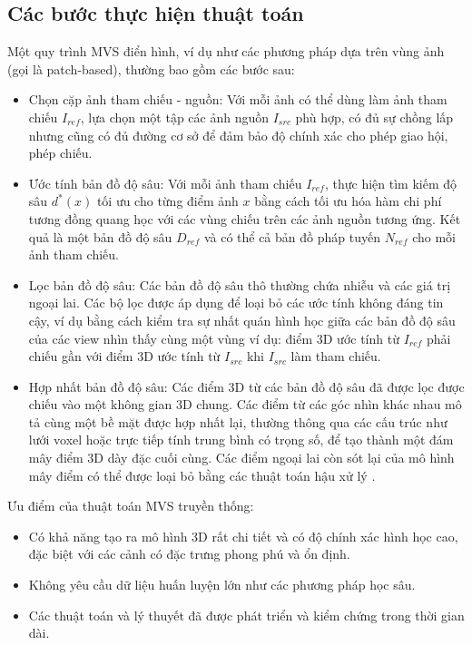 \subsection{Các bước thực hiện thuật toán}
\label{subsec:mvs_steps}

Một quy trình MVS điển hình, ví dụ như các phương pháp dựa trên vùng ảnh (gọi là patch-based), thường bao gồm các bước sau:

\begin{itemize}
    \item Chọn cặp ảnh tham chiếu - nguồn: Với mỗi ảnh có thể dùng làm ảnh tham chiếu $I_{ref}$, lựa chọn một tập các ảnh nguồn $I_{src}$ phù hợp, có đủ sự chồng lấp nhưng cũng có đủ đường cơ sở để đảm bảo độ chính xác cho phép giao hội, phép chiếu.
    \item Ước tính bản đồ độ sâu: Với mỗi ảnh tham chiếu $I_{ref}$, thực hiện tìm kiếm độ sâu $d^*(x)$ tối ưu cho từng điểm ảnh $x$ bằng cách tối ưu hóa hàm chi phí tương đồng quang học với các vùng chiếu trên các ảnh nguồn tương ứng. Kết quả là một bản đồ độ sâu $D_{ref}$ và có thể cả bản đồ pháp tuyến $N_{ref}$ cho mỗi ảnh tham chiếu.

    \item Lọc bản đồ độ sâu: Các bản đồ độ sâu thô thường chứa nhiễu và các giá trị ngoại lai. Các bộ lọc được áp dụng để loại bỏ các ước tính không đáng tin cậy, ví dụ bằng cách kiểm tra sự nhất quán hình học giữa các bản đồ độ sâu của các view nhìn thấy cùng một vùng ví dụ: điểm 3D ước tính từ $I_{ref}$ phải chiếu gần với điểm 3D ước tính từ $I_{src}$ khi $I_{src}$ làm tham chiếu.
    \item Hợp nhất bản đồ độ sâu: Các điểm 3D từ các bản đồ độ sâu đã được lọc được chiếu vào một không gian 3D chung. Các điểm từ các góc nhìn khác nhau mô tả cùng một bề mặt được hợp nhất lại, thường thông qua các cấu trúc như lưới voxel hoặc trực tiếp tính trung bình có trọng số, để tạo thành một đám mây điểm 3D dày đặc cuối cùng. Các điểm ngoại lai còn sót lại của mô hình mây điểm có thể được loại bỏ bằng các thuật toán hậu xử lý \cite{schoenberger2016mvs}.
\end{itemize}

Ưu điểm của thuật toán MVS truyền thống:
\begin{itemize}
    \item Có khả năng tạo ra mô hình 3D rất chi tiết và có độ chính xác hình học cao, đặc biệt với các cảnh có đặc trưng phong phú và ổn định.
    \item Không yêu cầu dữ liệu huấn luyện lớn như các phương pháp học sâu.
    \item Các thuật toán và lý thuyết đã được phát triển và kiểm chứng trong thời gian dài.
\end{itemize}

